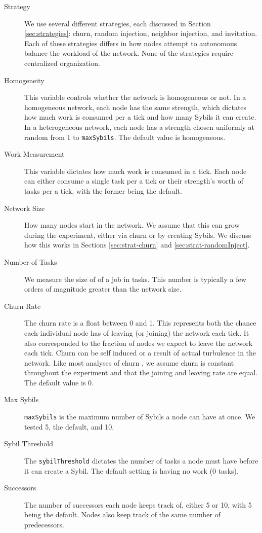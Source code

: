 \begin{description}
	\item [Strategy] We use several different strategies, each discussed in Section \ref{sec:strategies}: churn, random injection, neighbor injection, and invitation.
	Each of these strategies differs in how nodes attempt  to autonomous balance the workload of the network.
	None of the strategies require centralized organization.
	\item [Homogeneity]  This variable controls whether the network is homogeneous or not.
	In a homogeneous network, each node has the same strength, which dictates how much work is consumed per a tick and how many Sybils it can create.
	In a heterogeneous network, each node has a strength chosen uniformly at random from 1 to \texttt{maxSybils}.
	The default value is homogeneous.
	\item [Work Measurement] This variable dictates how much work is consumed in a tick.
	Each node can either consume a single task per a tick or their strength's worth of tasks per a tick, with the former being the default.
	\item [Network Size]  How many nodes start in the network.  
	We assume that this can grow during the experiment, either via churn or by creating Sybils.
	We discuss how this works in Sections \ref{sec:strat-churn} and \ref{sec:strat-randomInject}.
	\item [Number of Tasks] We measure the size of of a job in tasks.
	This number is typically a few orders of magnitude greater than the network size.
	\item [Churn Rate] The churn rate is a float between 0 and 1.
	This represents both the chance each individual node has of leaving (or joining) the network each tick.
	It also corresponded to the fraction of nodes we expect to leave the network each tick.
	Churn can be self induced or a result of actual turbulence in the network.
	Like most analyses of churn \cite{marozzo2012p2p}, we assume churn is constant throughout the experiment and that the joining and leaving rate are equal.
	The default value is 0.
	\item [Max Sybils] \texttt{maxSybils} is the maximum number of Sybils a node can have at once.  We tested 5, the default, and 10.
	\item [Sybil Threshold] The \texttt{sybilThreshold} dictates the number of tasks a node must have before it can create a Sybil.  The default setting is having no work (0 tasks).
	\item [Successors] The number of successors each node keeps track of, either 5 or 10, with 5 being the default.
	Nodes also keep track of the same number of predecessors.
	
\end{description}

